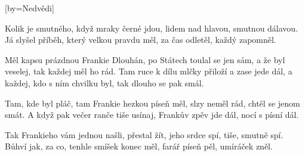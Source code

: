 [by={Nedvědi}]

\beginverse{}
Kolik je smutného, když mraky černé jdou,
lidem nad hlavou, smutnou dálavou.
Já slyšel příběh, který velkou pravdu měl,
za čas odletěl, každý zapomněl.
\endverse{}

\beginchorus{}
Měl kapsu prázdnou Frankie Dlouhán,
po Státech toulal se jen sám,
a že byl veselej, tak každej měl ho rád.
Tam ruce k dílu mlčky přiloží a zase jede dál,
a každej, kdo s ním chvilku byl,
tak dlouho se pak smál.
\endchorus{}

\beginverse{}
Tam, kde byl pláč, tam Frankie hezkou píseň měl,
slzy neměl rád, chtěl se jenom smát.
A když pak večer ranče tiše usínaj,
Frankův zpěv jde dál, nocí s písní dál.
\endverse{}

\beginchorus{}

\endchorus{}

\beginverse{}
Tak Frankieho vám jednou našli, přestal žít,
jeho srdce spí, tiše, smutně spí.
Bůhví jak, za co, tenhle smíšek konec měl,
farář píseň pěl, umíráček zněl.
\endverse{}

\beginchorus{}

\endchorus{}

\endsong{}
